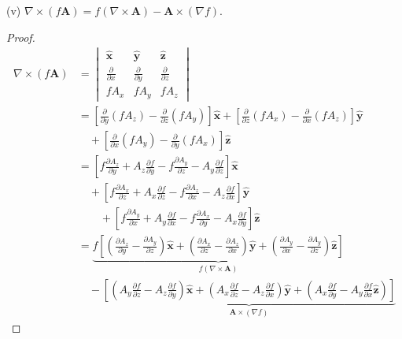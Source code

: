 \documentclass[a4paper]{article}
\begin{document}
(v) \( \nabla \times \!\left( f \pmb{A} \right) = f \!\left( \nabla \times \pmb{A} \right) - \pmb{A} \times \!\left( \nabla f \right) \).

\begin{proof}[Proof]
\begin{align*}
	\nabla \times \!\left( f \pmb{A} \right) & = \begin{vmatrix}
		\pmb{\hat{x}} & \pmb{\hat{y}} & \pmb{\hat{z}} \\
		\frac{\partial }{\partial x} & \frac{\partial }{\partial y} & \frac{\partial }{\partial z} \\
		fA_{x} & fA_{y} & fA_{z}
	\end{vmatrix} \\
						 & = \!\left[ \frac{\partial }{\partial y}\!\left( fA_{z} \right) - \frac{\partial }{\partial z}\!\left( fA_{y} \right) \right]\pmb{\hat{x}} + \!\left[ \frac{\partial }{\partial z}\!\left( fA_{x} \right) - \frac{\partial }{\partial x}\!\left( fA_{z} \right) \right]\pmb{\hat{y}} \\
						 & \quad + \!\left[ \frac{\partial }{\partial x}\!\left( fA_{y} \right) - \frac{\partial }{\partial y}\!\left( fA_{x} \right) \right]\pmb{\hat{z}} \\ 
						 & = \!\left[ f \frac{\partial A_{z}}{\partial y} + A_{z}\frac{\partial f}{\partial y} - f \frac{\partial A_{y}}{\partial z} - A_{y}\frac{\partial f}{\partial z} \right]\pmb{\hat{x}} \\
						 & \quad + \!\left[ f \frac{\partial A_{x}}{\partial z} + A_{x}\frac{\partial f}{\partial z} - f \frac{\partial A_{z}}{\partial x} - A_{z}\frac{\partial f}{\partial x} \right]\pmb{\hat{y}} \\
						 & \qquad + \!\left[ f \frac{\partial A_{y}}{\partial x} + A_{y}\frac{\partial f}{\partial x} - f \frac{\partial A_{x}}{\partial y} - A_{x}\frac{\partial f}{\partial y} \right]\pmb{\hat{z}} \\
						 & = \underbrace{f \!\left[ \!\left( \frac{\partial A_{z}}{\partial y} - \frac{\partial A_{y}}{\partial z} \right)\pmb{\hat{x}} + \!\left( \frac{\partial A_{x}}{\partial z} - \frac{\partial A_{z}}{\partial x} \right)\pmb{\hat{y}} + \!\left( \frac{\partial A_{y}}{\partial x} - \frac{\partial A_{y}}{\partial z} \right)\pmb{\hat{z}} \right]}_{f \!\left( \nabla \times \pmb{A} \right)} \\
						 & \quad - \underbrace{\!\left[  \!\left( A_{y}\frac{\partial f}{\partial z} - A_{z}\frac{\partial f}{\partial y} \right)\pmb{\hat{x}} + \!\left( A_{x}\frac{\partial f}{\partial z} - A_{z}\frac{\partial f}{\partial x} \right)\pmb{\hat{y}} + \!\left( A_{x}\frac{\partial f}{\partial y} - A_{y}\frac{\partial f}{\partial x}\pmb{\hat{z}} \right) \right]}_{\pmb{A} \times \!\left( \nabla f \right)}
\end{align*}
\end{proof}
\end{document}
